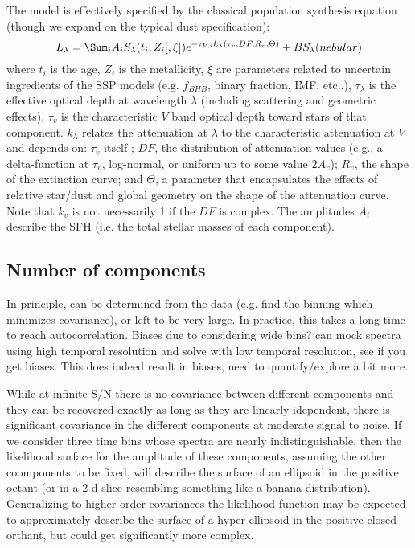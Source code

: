 The model is effectively specified by the classical population synthesis equation (though we expand on the typical dust specification):
\begin{equation}
L_\lambda = \Sum_i A_i S_\lambda (t_i, Z_i [,\xi] ) e^{-\tau_{V,i} k_\lambda( \tau_v, DF, R_v, \Theta)}  + B S_\lambda(nebular)
\end{equation}
where $t_i$ is the age, $Z_i$ is the metallicity, $\xi$ are parameters related to uncertain ingredients of the SSP models (e.g. $f_{BHB}$, binary fraction, IMF, etc..), $\tau_\lambda$ is the effective optical depth at wavelength $\lambda$ (including scattering and geometric effects), $\tau_v$ is the characteristic $V$ band optical depth toward stars of that component. $k_\lambda$ relates the attenuation at $\lambda$ to the characteristic attenuation at $V$ and depends on: $\tau_v$ itself \citep{chevallard}; $DF$,  the distribution of attenuation values (e.g., a delta-function at $\tau_v$, log-normal, or uniform up to some value $2A_v$); $R_v$, the shape of the extinction curve; and $\Theta$, a parameter that encapsulates the effects of relative star/dust and global geometry on the shape of the attenuation curve.  Note that $k_v$ is not necessarily 1 if the $DF$ is complex. The amplitudes $A_i$ describe the SFH (i.e. the total stellar masses of each component).


\subsection{Number of components}
In principle, can be determined from the data (e.g. find the binning which minimizes covariance), or left to be very large.  In practice, this takes a long time to reach autocorrelation. Biases due to considering wide bins?  can mock spectra using high temporal resolution and solve with low temporal resolution, see if you get biases.  This does indeed result in biases, need to quantify/explore a bit more.

While at infinite S/N there is no covariance between different components and they can be recovered exactly as long as they are linearly idependent, there is significant covariance in the different components at moderate signal to noise.  If we consider three time bins whose spectra are nearly indistinguishable, then the likelihood surface for the amplitude of these components, assuming the other coomponents to be fixed, will describe the surface of an ellipsoid in the positive octant (or in a 2-d slice resembling something like a banana distribution).  Generalizing to higher order covariances the likelihood function may be expected to approximately describe the surface of a hyper-ellipsoid in the positive closed orthant, but could get significantly more complex.

